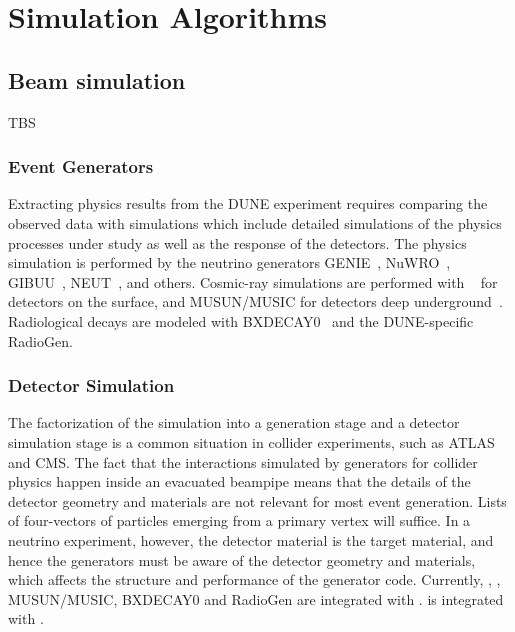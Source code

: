 \section{Simulation Algorithms }
\label{sec:algo:sim}

\subsection{Beam simulation}
\label{sec:beamsim}

TBS

\subsubsection{Event Generators}
\label{sec:eventgen}

Extracting physics results from the DUNE experiment requires comparing the observed data with simulations which include detailed simulations of the physics processes under study as well as the response of the detectors.  The physics simulation is performed by the neutrino generators GENIE~\cite{Andreopoulos:2009rq}, NuWRO~\cite{NuWro2012}, GIBUU~\cite{Gallmeister:2016dnq}, NEUT~\cite{Hayato:2009zz}, and others.  Cosmic-ray simulations are performed with ~\cite{Wentz:2003bp,Dembinski:2020wrp} for detectors on the surface, and MUSUN/MUSIC for detectors deep underground~\cite{Kudryavtsev:2008qh,LBNEDOCDB9673}.  Radiological decays are modeled with BXDECAY0~\cite{Ponkratenko:2000um} and the DUNE-specific RadioGen.

\subsubsection{Detector Simulation}
\label{sec:detsim}

The factorization of the simulation into a generation stage and a detector simulation stage is a common situation in collider experiments, such as ATLAS and CMS.  The fact that the interactions simulated by generators for collider physics happen inside an evacuated beampipe means that the details of the detector geometry and materials are not relevant for most event generation.  Lists of four-vectors of particles emerging from a primary vertex will suffice.  In a neutrino experiment, however, the detector material is the target material, and hence the generators must be aware of the detector geometry and materials, which affects the structure and performance of the generator code.  Currently, , , MUSUN/MUSIC, BXDECAY0 and RadioGen are integrated with .   is integrated with .


